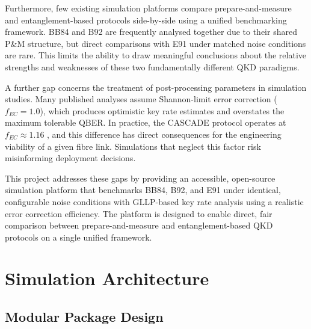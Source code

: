 Furthermore, few existing simulation platforms compare prepare-and-measure and entanglement-based protocols side-by-side using a unified benchmarking framework. BB84 and B92 are frequently analysed together due to their shared P\&M structure, but direct comparisons with E91 under matched noise conditions are rare. This limits the ability to draw meaningful conclusions about the relative strengths and weaknesses of these two fundamentally different QKD paradigms.

A further gap concerns the treatment of post-processing parameters in simulation studies. Many published analyses assume Shannon-limit error correction ($f_{EC} = 1.0$), which produces optimistic key rate estimates and overstates the maximum tolerable QBER. In practice, the CASCADE protocol operates at $f_{EC} \approx 1.16$ \cite{Cascade1994}, and this difference has direct consequences for the engineering viability of a given fibre link. Simulations that neglect this factor risk misinforming deployment decisions.

This project addresses these gaps by providing an accessible, open-source simulation platform that benchmarks BB84, B92, and E91 under identical, configurable noise conditions with GLLP-based key rate analysis using a realistic error correction efficiency. The platform is designed to enable direct, fair comparison between prepare-and-measure and entanglement-based QKD protocols on a single unified framework.


%
%


\section{Simulation Architecture}

\subsection{Modular Package Design}

